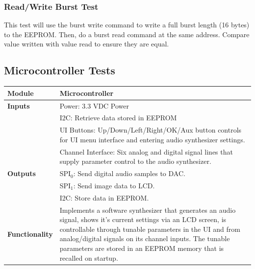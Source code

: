 \documentclass{article}
\begin{document}
\subsubsection{Read/Write Burst Test}
This test will use the burst write command to write a full burst length (16 bytes) to the EEPROM. Then, do a burst read command at the same address. Compare value written with value read to ensure they are equal.

\subsection{Microcontroller Tests}

\begin{tabular}{|p{1in}|p{5in}|}
\hline
\textbf{Module} & Microcontroller \\
\hline
\textbf{Inputs}& Power: 3.3 VDC Power\\
	     & I2C: Retrieve data stored in EEPROM\\
	     & UI Buttons: Up/Down/Left/Right/OK/Aux button controls for UI menu interface and entering audio synthesizer settings.\\
	     & Channel Interface: Six analog and digital signal lines that supply parameter control to the audio synthesizer.\\
\hline
\textbf{Outputs}& SPI$_0$: Send digital audio samples to DAC.\\
	      & SPI$_1$: Send image data to LCD.\\
	      & I2C: Store data in EEPROM.\\ 
\hline
\textbf{Functionality}& Implements a software synthesizer that generates an audio signal, shows it's current settings via an LCD screen, is controllable through tunable parameters in the UI and from analog/digital signals on its channel inputs. The tunable parameters are stored in an EEPROM memory that is recalled on startup.\\
\hline
\end{tabular}
\end{document}

